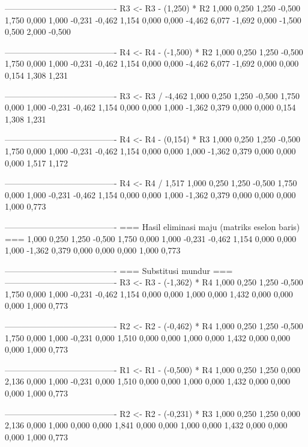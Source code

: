 \documentclass[12pt]{article}
\begin{document}
\begin{enumerate}
\begin{keluaran}
----------------------------------------
R3 <- R3 - (1,250) * R2
1,000   0,250   1,250   -0,500  1,750
0,000   1,000   -0,231  -0,462  1,154
0,000   0,000   -4,462  6,077   -1,692
0,000   -1,500  0,500   2,000   -0,500

----------------------------------------
R4 <- R4 - (-1,500) * R2
1,000   0,250   1,250   -0,500  1,750
0,000   1,000   -0,231  -0,462  1,154
0,000   0,000   -4,462  6,077   -1,692
0,000   0,000   0,154   1,308   1,231

----------------------------------------
R3 <- R3 / -4,462
1,000   0,250   1,250   -0,500  1,750
0,000   1,000   -0,231  -0,462  1,154
0,000   0,000   1,000   -1,362  0,379
0,000   0,000   0,154   1,308   1,231

----------------------------------------
R4 <- R4 - (0,154) * R3
1,000   0,250   1,250   -0,500  1,750
0,000   1,000   -0,231  -0,462  1,154
0,000   0,000   1,000   -1,362  0,379
0,000   0,000   0,000   1,517   1,172

----------------------------------------
R4 <- R4 / 1,517
1,000   0,250   1,250   -0,500  1,750
0,000   1,000   -0,231  -0,462  1,154
0,000   0,000   1,000   -1,362  0,379
0,000   0,000   0,000   1,000   0,773

----------------------------------------
=== Hasil eliminasi maju (matriks eselon baris) ===
1,000   0,250   1,250   -0,500  1,750
0,000   1,000   -0,231  -0,462  1,154
0,000   0,000   1,000   -1,362  0,379
0,000   0,000   0,000   1,000   0,773

----------------------------------------
=== Substitusi mundur ===
----------------------------------------
R3 <- R3 - (-1,362) * R4
1,000   0,250   1,250   -0,500  1,750
0,000   1,000   -0,231  -0,462  1,154
0,000   0,000   1,000   0,000   1,432
0,000   0,000   0,000   1,000   0,773

----------------------------------------
R2 <- R2 - (-0,462) * R4
1,000   0,250   1,250   -0,500  1,750
0,000   1,000   -0,231  0,000   1,510
0,000   0,000   1,000   0,000   1,432
0,000   0,000   0,000   1,000   0,773

----------------------------------------
R1 <- R1 - (-0,500) * R4
1,000   0,250   1,250   0,000   2,136
0,000   1,000   -0,231  0,000   1,510
0,000   0,000   1,000   0,000   1,432
0,000   0,000   0,000   1,000   0,773

----------------------------------------
R2 <- R2 - (-0,231) * R3
1,000   0,250   1,250   0,000   2,136
0,000   1,000   0,000   0,000   1,841
0,000   0,000   1,000   0,000   1,432
0,000   0,000   0,000   1,000   0,773


\end{keluaran}
\end{enumerate}
\end{document}
